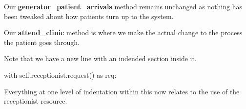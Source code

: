 \documentclass[
  letterpaper,
  DIV=11,
  numbers=noendperiod]{scrreprt}
\newenvironment{Shaded}{}{}
\newcommand{\ControlFlowTok}[1]{\textcolor[rgb]{0.84,0.23,0.29}{#1}}
\newcommand{\ImportTok}[1]{\textcolor[rgb]{0.01,0.18,0.38}{#1}}
\newcommand{\NormalTok}[1]{\textcolor[rgb]{0.14,0.16,0.18}{#1}}
\newcommand{\VariableTok}[1]{\textcolor[rgb]{0.89,0.38,0.04}{#1}}
\begin{document}
Our \textbf{generator\_patient\_arrivals} method remains unchanged as
nothing has been tweaked about how patients turn up to the system.

Our \textbf{attend\_clinic} method is where we make the actual change to
the process the patient goes through.

Note that we have a new line with an indended section inside it.

\begin{Shaded}
\begin{Highlighting}[]
\ControlFlowTok{with} \VariableTok{self}\NormalTok{.receptionist.request() }\ImportTok{as}\NormalTok{ req:}
\end{Highlighting}
\end{Shaded}

Everything at one level of indentation within this now relates to the
use of the receptionist resource.
\end{document}

